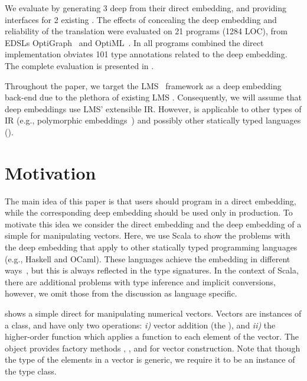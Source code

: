 %
%
We evaluate \yy by generating 3 deep \edsls from their direct
embedding, and providing interfaces for 2 existing \edsls. The effects
of concealing the deep embedding and reliability of the translation
were evaluated on 21 programs (1284 LOC), from EDSLs
OptiGraph~\cite{composition-ecoop2013} and
OptiML~\cite{sujeeth_optiml:_2011}. In all programs combined the
direct implementation obviates 101 type annotations related to the
deep embedding. The complete evaluation is presented in
.

Throughout the paper, we target the LMS~\cite{rompf_lightweight_2012}
framework as a deep embedding back-end due to the plethora of existing
LMS \edsls.  Consequently, we will assume that deep embeddings use
LMS' extensible IR.  However, \yy is applicable to other types of IR
(e.g., polymorphic embeddings~\cite{hofer_polymorphic_2008}) and
possibly other statically typed languages ().

\section{Motivation}
\label{sec:motivation}

The main idea of this paper is that \edsl{} users should program in a
direct embedding, while the corresponding deep embedding should be used only in production.
To motivate this idea we consider the direct embedding and the deep embedding of a simple \edsl for manipulating vectors. Here, we use Scala to show the problems with the deep embedding that apply to other statically typed programming languages (e.g., Haskell and OCaml). These languages achieve the embedding in different ways~\cite{svenningsson_combining_2012,awesome,carette_finally_2009,guerrero_implementing_2004}, but this is always reflected in the type signatures. In the context of Scala, there are additional problems with type inference and implicit conversions, however, we omit those from the discussion as language specific.

 shows a simple direct \edsl{} for manipulating numerical vectors.
Vectors are instances of a  class, and have only two operations:
\emph{i)} vector addition (the \code{+}), and \emph{ii)} the higher-order  function which applies a function  to each element of the vector. The  object provides factory methods , , and  for vector construction. Note that though the type of the elements in a vector is generic, we require it to be an instance of the  type class.

